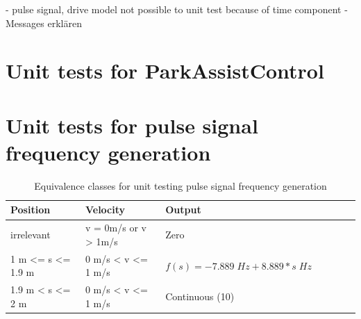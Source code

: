 - pulse signal, drive model not possible to unit test because of time component
- Messages erklären\\

\section{Unit tests for ParkAssistControl}

\section{Unit tests for pulse signal frequency generation}

\begin{table}[H]
\centering
\caption{Equivalence classes for unit testing pulse signal frequency generation}
\begin{adjustbox}{width=1\textwidth, center=\textwidth}
\renewcommand{\arraystretch}{1}
\begin{tabular}{lllllll}
\textbf{Position} & \textbf{Velocity} & \textbf{Output} \\\hline
irrelevant & v = 0m/s or v > 1m/s & Zero\\
1 m <= s <= 1.9 m  & 0 m/s < v <= 1 m/s & $f(s)=-7.889\; Hz + 8.889*s\; Hz$\\
1.9 m < s <= 2 m  & 0 m/s < v <= 1 m/s & Continuous (10)
\end{tabular}
\end{adjustbox}
\end{table}

